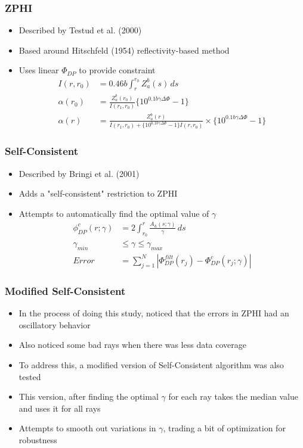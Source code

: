 \documentclass[red]{beamer}
\begin{document}
\begin{frame}
	\frametitle{ZPHI}
	\begin{itemize}
		\item Described by Testud et al. (2000)
		\item Based around Hitschfeld (1954) reflectivity-based method
		\item Uses linear $\Phi_{DP}$ to provide constraint
			\begin{align*}
			I(r, r_0) &= \num{0.46}b\int_r^{r_0}Z_a^b(s)\,ds \\
			\alpha(r_0) &= \frac{Z_a^b(r_0)}{I(r_1,r_0)} \lbrace 10^{\num{0.1}b\gamma\Delta\Phi} - 1\rbrace \\
			\alpha(r) &= \frac{Z_a^b(r)}{I(r_1,r_0) + \lbrace 10^{\num{0.1}b\gamma\Delta\Phi} - 1\rbrace I(r, r_0)}
			  \times \lbrace 10^{\num{0.1}b\gamma\Delta\Phi} - 1\rbrace
			\end{align*}
	\end{itemize}
\end{frame}

\begin{frame}
	\frametitle{Self-Consistent}
	\begin{itemize}
		\item Described by Bringi et al. (2001)
		\item Adds a "self-consistent" restriction to ZPHI
		\item Attempts to automatically find the optimal value of $\gamma$
			 \begin{align*}
			\phi_{DP}^c(r;\gamma) &= 2 \int_{r_0}^r \frac{A_h(s;\gamma)}{\gamma}\,ds \\
			\gamma_{min} &\leq \gamma \leq \gamma_{max} \\
			Error &= \sum_{j=1}^N \left| \Phi_{DP}^{filt}(r_j) - \Phi_{DP}^c(r_j;\gamma) \right|
			\end{align*}
	\end{itemize}
\end{frame}

\begin{frame}[<+->]
	\frametitle{Modified Self-Consistent}
	\begin{itemize}
		\item In the process of doing this study, noticed that the errors in ZPHI
		had an oscillatory behavior
		\item Also noticed some bad rays when there was less data coverage
		\item To address this, a modified version of Self-Consistent algorithm
		was also tested
		\item This version, after finding the optimal $\gamma$ for each ray
		takes the median value and uses it for all rays
		\item Attempts to smooth out variations in $\gamma$, trading a bit of
		optimization for robustness
	\end{itemize}
\end{frame}
\end{document}
